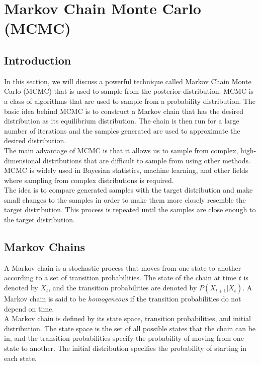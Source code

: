 \chapter{Markov Chain Monte Carlo (MCMC)}

\section{Introduction}

In this section, we will discuss a powerful technique called Markov Chain Monte Carlo (MCMC) that is used to sample from the posterior distribution. MCMC is a class of algorithms that are used to sample from a probability distribution. The basic idea behind MCMC is to construct a Markov chain that has the desired distribution as its equilibrium distribution. The chain is then run for a large number of iterations and the samples generated are used to approximate the desired distribution. \\

The main advantage of MCMC is that it allows us to sample from complex, high-dimensional distributions that are difficult to sample from using other methods. MCMC is widely used in Bayesian statistics, machine learning, and other fields where sampling from complex distributions is required. \\

The idea is to compare generated samples with the target distribution and make small changes to the samples in order to make them more closely resemble the target distribution. This process is repeated until the samples are close enough to the target distribution. \\

\section{Markov Chains}

A Markov chain is a stochastic process that moves from one state to another according to a set of transition probabilities. The state of the chain at time $t$ is denoted by $X_t$, and the transition probabilities are denoted by $P(X_{t+1} | X_t)$. A Markov chain is said to be \textit{homogeneous} if the transition probabilities do not depend on time. \\

A Markov chain is defined by its state space, transition probabilities, and initial distribution. The state space is the set of all possible states that the chain can be in, and the transition probabilities specify the probability of moving from one state to another. The initial distribution specifies the probability of starting in each state. \\

